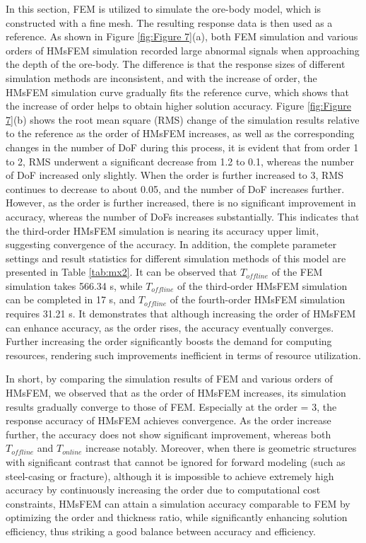 \documentclass[manuscript,blind]{geophysics}
\providecommand{\DIFadd}[1]{{\protect\color{blue}\uwave{#1}}} %
\providecommand{\DIFdel}[1]{{\protect\color{red}\sout{#1}}}                      %
\providecommand{\DIFaddbegin}{} %
\providecommand{\DIFaddend}{} %
\providecommand{\DIFdelbegin}{} %
\providecommand{\DIFdelend}{} %
\newcommand{\DIFscaledelfig}{0.5}
\newlength{\DIFdelgraphicswidth} %
\newlength{\DIFdelgraphicsheight} %
\newcommand{\DIFaddincludegraphics}[2][]{{\color{blue}\fbox{\DIFOincludegraphics[#1]{#2}}}} %
\newcommand{\DIFdelincludegraphics}[2][]{%
\sbox{\DIFdelgraphicsbox}{\DIFOincludegraphics[#1]{#2}}%
\settoboxwidth{\DIFdelgraphicswidth}{\DIFdelgraphicsbox} %
\settoboxtotalheight{\DIFdelgraphicsheight}{\DIFdelgraphicsbox} %
\scalebox{\DIFscaledelfig}{%
\parbox[b]{\DIFdelgraphicswidth}{\usebox{\DIFdelgraphicsbox}\\[-\baselineskip] \rule{\DIFdelgraphicswidth}{0em}}\llap{\resizebox{\DIFdelgraphicswidth}{\DIFdelgraphicsheight}{%
\setlength{\unitlength}{\DIFdelgraphicswidth}%
\begin{picture}(1,1)%
\thicklines\linethickness{2pt} %
{\color[rgb]{1,0,0}\put(0,0){\framebox(1,1){}}}%
{\color[rgb]{1,0,0}\put(0,0){\line( 1,1){1}}}%
{\color[rgb]{1,0,0}\put(0,1){\line(1,-1){1}}}%
\end{picture}%
}\hspace*{3pt}}} %
} %
\DeclareRobustCommand{\DIFaddbegin}{\DIFOaddbegin \let\includegraphics\DIFaddincludegraphics} %
\DeclareRobustCommand{\DIFaddend}{\DIFOaddend \let\includegraphics\DIFOincludegraphics} %
\DeclareRobustCommand{\DIFdelbegin}{\DIFOdelbegin \let\includegraphics\DIFdelincludegraphics} %
\DeclareRobustCommand{\DIFdelend}{\DIFOaddend \let\includegraphics\DIFOincludegraphics} %
\begin{document}
In this section, FEM is utilized to simulate the ore-body model, which is constructed with a fine mesh. The resulting response data is then used as a reference. As shown in Figure \ref{fig:Figure 7}(a), both FEM simulation and various orders of HMsFEM simulation recorded large abnormal signals when approaching the depth of the ore-body. The difference is that the response sizes of different simulation methods are inconsistent, and with the increase of order, the HMsFEM simulation curve gradually fits the reference curve, which shows that the increase of order helps to obtain higher solution accuracy. Figure \ref{fig:Figure 7}(b) shows the root mean square (RMS) change of the simulation results relative to the reference as the order of HMsFEM increases, as well as the corresponding changes in the number of DoF during this process, it is evident that from order 1 to 2, RMS underwent a significant decrease from 1.2 to 0.1, whereas the number of DoF increased only slightly. When the order is further increased to 3, RMS continues to decrease to about 0.05, and the number of DoF increases further. However, as the order is further increased, there is no significant improvement in accuracy, whereas the number of DoFs increases substantially. This indicates that the third-order HMsFEM simulation is nearing its accuracy upper limit, suggesting convergence of the accuracy. In addition, the complete parameter settings and result statistics for different simulation methods of this model are presented in Table \ref{tab:mx2}. It can be observed that \DIFdelbegin \DIFdel{${T_{offline}}$ }\DIFdelend \DIFaddbegin \DIFadd{${T_{online}}$ }\DIFaddend of the FEM simulation takes 566.34 s, while  \DIFdelbegin \DIFdel{${T_{offline}}$ }\DIFdelend \DIFaddbegin \DIFadd{${T_{online}}$ }\DIFaddend of the third-order HMsFEM simulation can be completed in 17 s, and \DIFdelbegin \DIFdel{${T_{offline}}$ }\DIFdelend \DIFaddbegin \DIFadd{${T_{online}}$ }\DIFaddend of the fourth-order HMsFEM simulation requires 31.21 s. It demonstrates that although increasing the order of HMsFEM can enhance accuracy, as the order rises, the accuracy eventually converges. Further increasing the order significantly boosts the demand for computing resources, rendering such improvements inefficient in terms of resource utilization.

In short, by comparing the simulation results of FEM and various orders of HMsFEM, we observed that as the order of HMsFEM increases, its simulation results gradually converge to those of FEM. Especially at the order = 3, the response accuracy of HMsFEM achieves convergence. As the order increase further, the accuracy does not show significant improvement, whereas both ${T_{offline}}$ and ${T_{online}}$ increase notably. Moreover, when there is geometric structures with significant contrast that cannot be ignored for forward modeling (such as steel-casing or fracture), although it is impossible to achieve extremely high accuracy by continuously increasing the order due to computational cost constraints, HMsFEM can attain a simulation accuracy comparable to FEM by optimizing the order and thickness ratio, while significantly enhancing solution efficiency, thus striking a good balance between accuracy and efficiency.
\end{document}
